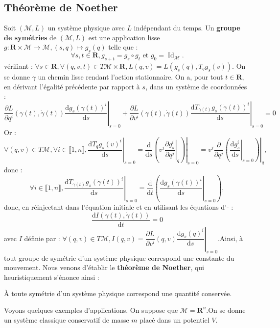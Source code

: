 \documentclass[12pt,a4paper]{article}
\DeclareMathOperator{\Id}{Id}
\theoremstyle{definition}
\begin{document}
\subsection{Théorème de Noether}
Soit $(\mathcal{M},L)$ un système physique avec $L$ indépendant du temps.\newline
Un \textbf{groupe de symétries} de $(\mathcal{M},L)$ est une application lisse\newline $g:\mathbf{R}\times\mathcal{M}\to\mathcal{M},(s,q)\mapsto g_s(q)$ telle que :
$$
\forall s,t\in\mathbf{R}, g_{s+t}=g_s\circ g_t\text{ et }g_0=\Id_\mathcal{M}.
$$
vérifiant : $\forall s\in\mathbf{R},\forall (q,v,t)\in T\mathcal{M}\times\mathbf{R}, L(q,v)=L(g_s(q),T_qg_s(v))$.
On se donne $\gamma$ un chemin lisse rendant l'action stationnaire. On a, pour tout $t\in\mathbf{R}$, en dérivant l'égalité précédente par rapport à $s$, dans un système de coordonnées :
$$
\dfrac{\partial L}{\partial q^i}(\gamma(t),\dot{\gamma}(t))\left.\dfrac{\mathrm{d}g_s(\gamma(t))^i}{\mathrm{d}s}\right|_{s=0}+\dfrac{\partial L}{\partial v^i}(\gamma(t),\dot{\gamma}(t))\left.\dfrac{\mathrm{d}T_{\gamma(t)}g_s(\dot{\gamma}(t))^i}{\mathrm{d}s}\right|_{s=0}=0
$$
Or :
$$\forall (q,v)\in T\mathcal{M},\forall i\in\llbracket 1,n\rrbracket,\left.\dfrac{\mathrm{d}T_qg_s(v)^i}{\mathrm{d}s}\right|_{s=0}=\left.\dfrac{\mathrm{d}}{\mathrm{d}s}\left(v^j\left.\dfrac{\partial g_s^i}{\partial q^j}\right|_{q}\right)\right|_{s=0}=v^j\left.\dfrac{\partial}{\partial q^j}\left(\left.\dfrac{\mathrm{d}g_s^i}{\mathrm{d}s}\right|_{s=0}\right)\right|_{q},$$
donc :
$$
\forall i\in\llbracket 1,n\rrbracket,\left.\dfrac{\mathrm{d}T_{\gamma(t)}g_s(\dot{\gamma}(t))^i}{\mathrm{d}s}\right|_{s=0}=\dfrac{\mathrm{d}}{\mathrm{d}t}\left(\left.\dfrac{\mathrm{d}g_s(\gamma(t))^i}{\mathrm{d}s}\right|_{s=0}\right),
$$
donc, en réinjectant dans l'équation initiale et en utilisant les équations d'- :
$$
\dfrac{\mathrm{d}I(\gamma(t),\dot{\gamma}(t))}{\mathrm{d}t}=0
$$
avec $I$ définie par : $\forall (q,v)\in T\mathcal{M},I(q,v)=\dfrac{\partial L}{\partial v^i}(q,v)\left.\dfrac{\mathrm{d}g_s(q)^i}{\mathrm{d}s}\right|_{s=0}$.\newline Ainsi, à tout groupe de symétrie d'un système physique correspond une constante du mouvement.
Nous venons d'établir le \textbf{théorème de Noether}, qui heuristiquement s'énonce ainsi :
\begin{center}
\og À toute symétrie d'un système physique correspond une quantité conservée. \fg{}
\end{center}
Voyons quelques exemples d'applications. On suppose que $\mathcal{M}=\mathbf{R}^n$.\newline On se donne un système classique conservatif de masse $m$ placé dans un potentiel $V$.
\end{document}
